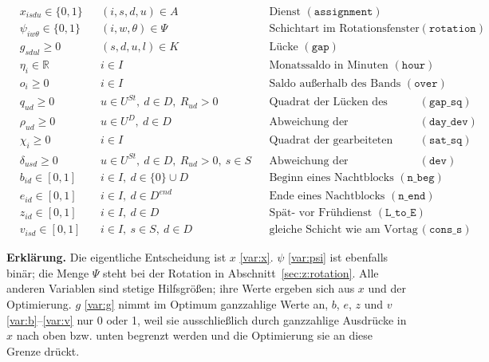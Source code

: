 \documentclass[11pt]{combiArticle}
\newcommand{\code}[1]{\texttt{#1}}
\begin{document}
\begin{align}
  & x_{isdu} \in \{0,1\} && (i,s,d,u) \in A && \text{Dienst } (\code{assignment}) \label{var:x}\\
  & \psi_{iw\theta} \in \{0,1\} && (i,w,\theta) \in \Psi && \text{Schichtart im Rotationsfenster } (\code{rotation}) \label{var:psi}\\
  & g_{sdul} \ge 0 && (s,d,u,l) \in K && \text{Lücke } (\code{gap}) \label{var:g}\\
  & \eta_i \in \mathbb{R} && i \in I && \text{Monatssaldo in Minuten } (\code{hour}) \label{var:eta}\\
  & o_i \ge 0 && i \in I && \text{Saldo außerhalb des Bands } (\code{over}) \label{var:o}\\
  & q_{ud} \ge 0 && u \in U^{St},\ d \in D,\ R_{ud} > 0 && \text{Quadrat der Lücken des Tages } (\code{gap\_sq}) \label{var:q}\\
  & \rho_{ud} \ge 0 && u \in U^{D},\ d \in D && \text{Abweichung der Tagesbesetzung } (\code{day\_dev}) \label{var:rho}\\
  & \chi_i \ge 0 && i \in I && \text{Quadrat der gearbeiteten Samstage } (\code{sat\_sq}) \label{var:chi}\\
  & \delta_{usd} \ge 0 && u \in U^{St},\ d \in D,\ R_{ud} > 0,\ s \in S && \text{Abweichung der Schichtbesetzung } (\code{dev}) \label{var:delta}\\
  & b_{id} \in [0,1] && i \in I,\ d \in \{0\} \cup D && \text{Beginn eines Nachtblocks } (\code{n\_beg}) \label{var:b}\\
  & e_{id} \in [0,1] && i \in I,\ d \in D^{end} && \text{Ende eines Nachtblocks } (\code{n\_end}) \label{var:e}\\
  & z_{id} \in [0,1] && i \in I,\ d \in D && \text{Spät- vor Frühdienst } (\code{L\_to\_E}) \label{var:z}\\
  & v_{isd} \in [0,1] && i \in I,\ s \in S,\ d \in D && \text{gleiche Schicht wie am Vortag } (\code{cons\_s}) \label{var:v}
\end{align}

\textbf{Erklärung.}
Die eigentliche Entscheidung ist $x$ \eqref{var:x}. $\psi$ \eqref{var:psi} ist ebenfalls binär; die Menge $\Psi$
steht bei der Rotation in Abschnitt~\ref{sec:z:rotation}. Alle anderen Variablen sind stetige Hilfsgrößen; ihre
Werte ergeben sich aus $x$ und der Optimierung. $g$ \eqref{var:g} nimmt im Optimum ganzzahlige Werte an, $b$, $e$,
$z$ und $v$ \eqref{var:b}--\eqref{var:v} nur 0 oder 1, weil sie ausschließlich durch ganzzahlige Ausdrücke in $x$
nach oben bzw. unten begrenzt werden und die Optimierung sie an diese Grenze drückt.
\end{document}
